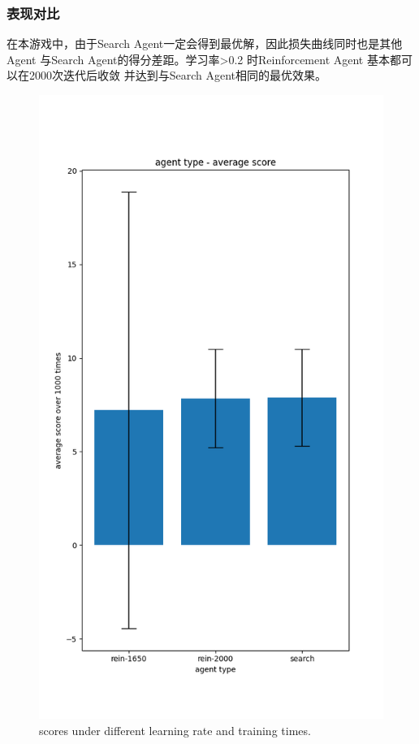 \documentclass{article}
\begin{document}
\begin{CJK}{UTF8}{gbsn}
\subsubsection{表现对比}
在本游戏中，由于Search Agent一定会得到最优解，因此损失曲线同时也是其他Agent
与Search Agent的得分差距。学习率>0.2 时Reinforcement Agent 基本都可以在2000次迭代后收敛
并达到与Search Agent相同的最优效果。
\begin{figure}[htbp]
  \centering
  \includegraphics[scale = 0.2]{images/comp_rein_search.png}
  \caption{scores under different learning rate and training times.}
\end{figure} 


\end{CJK}
\end{document}

